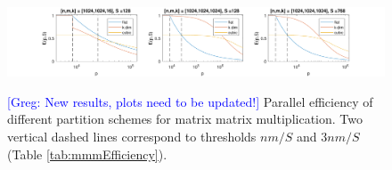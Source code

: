 \documentclass[sigplan,review,anonymous]{acmart}\settopmatter{printfolios=true,printccs=false,printacmref=false}
\newcommand\greg[1]{\textcolor{blue}{[Greg: #1]}}
\begin{document}


 \begin{figure}[t]
 	\hspace*{-1.5cm}
 	\includegraphics[width=2.5\columnwidth]{figures/mmmScaling}
 	\label{fig:mmmScaling}
 	\caption{\greg{New results, plots need to be updated!} Parallel efficiency 
 	of different partition schemes for matrix 
 		matrix multiplication. Two vertical dashed lines correspond to 
 		thresholds 
 		$nm/S$ and $3nm/S$ (Table \ref{tab:mmmEfficiency}).}
 \end{figure}
\end{document}
